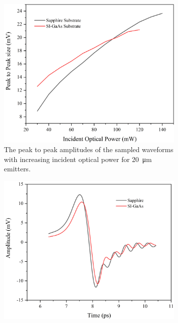 \begin{figure}
\begin{subfigure}{1\textwidth}
    \centering
    \includegraphics[scale=0.4]{Figures/Misc/SysDev/PKtoPKGvsSG.png}
    \caption{The peak to peak amplitudes of the sampled waveforms with increasing incident optical power for \SI{20}{\micro\metre} emitters.}
    \label{fig:sapphGaAspkpk}
    \vspace{10 mm}
\end{subfigure}
\vspace{10 mm}
\begin{subfigure}{1\textwidth}
    \centering
    \includegraphics[scale=0.4]{Figures/Misc/Theory/SIGaAsvsSapphG.png}

\end{subfigure}
\end{figure}
